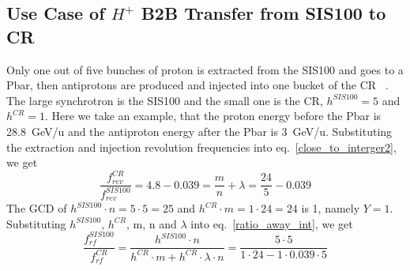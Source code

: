 %
%
\subsection{Use Case of $H^{+}$ B2B Transfer from SIS100 to CR} 
Only one out of five bunches of proton is extracted from the SIS100 and goes to a Pbar, then antiprotons are produced and injected into one bucket of the CR ~\cite{steck_demonstration_2011}. The large synchrotron is the SIS100 and the small one is the CR, $h^{\mathit{SIS100}}=5$ and $h^{\mathit{CR}}=1$. Here we take an example, that the proton energy before the Pbar is \SI{28.8}{GeV/\atomicmassunit} and the antiproton energy after the Pbar is \SI{3}{GeV/\atomicmassunit}. Substituting the extraction and injection revolution frequencies into eq.~\ref{close_to_interger2}, we get
\begin{equation} 
\frac{f_{\mathit{rev}}^{\mathit{CR}}}{f_{\mathit{rev}}^{\mathit{SIS100}}}=4.8-0.039=\frac{m}{n}+ \lambda=\frac{24}{5}-0.039
\end{equation}
The GCD of $h^{\mathit{SIS100}}\cdot n=5\cdot5=25$ and $h^{\mathit{CR}} \cdot m=1\cdot 24=24$ is 1, namely $Y=1$. Substituting $h^{\mathit{SIS100}}$, $h^{\mathit{CR}}$, m, n and $\lambda$ into eq.~\ref{ratio_away_int}, we get
\begin{equation} 
\frac{f_{\mathit{rf}}^{\mathit{SIS100}}}{f_{\mathit{rf}}^{\mathit{CR}}}=\frac{h^{\mathit{SIS100}}\cdot n}{h^{\mathit{CR}} \cdot m+ h^{\mathit{CR}} \cdot\lambda\cdot n}=\frac{5\cdot 5}{1 \cdot 24- 1 \cdot0.039\cdot 5}
\end{equation}

